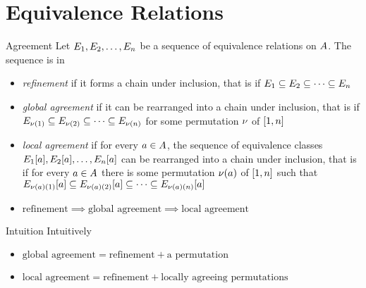 \documentclass{beamer}
\begin{document}
\section{Equivalence Relations}
\begin{frame}{Agreement}
Let $E_{1},E_{2},\dots,E_{n}$ be a sequence of equivalence relations on
$A$. The sequence is in
\begin{itemize}
  \item
  \emph{refinement} if it forms a chain under
  inclusion,
  that is if $E_{1}\subseteq E_{2}\subseteq\dots\subseteq E_{n}$
  
  \pause
  \item
  \emph{global agreement} if it can be rearranged into
  a chain under inclusion,
  that is if $E_{\nu(1)}\subseteq E_{\nu(2)}\subseteq\dots
  \subseteq E_{\nu(n)}$ for some permutation $\nu$ of $[1,n]$
  
  \pause
  \item
  \emph{local agreement} if for every $a\in A$,
  the sequence of equivalence classes
  $E_{1}[a],E_{2}[a],\dots,E_{n}[a]$ can be rearranged into a
  chain under inclusion, that is if for every $a\in A$ there
  is some permutation $\nu(a)$ of $[1,n]$ such that
  $E_{\nu(a)(1)}[a]\subseteq E_{\nu(a)(2)}[a]\subseteq
  \dots\subseteq E_{\nu(a)(n)}[a]$
  
  \pause
  \item
  $\text{refinement} \implies \text{global agreement} \implies \text{local
  agreement}$
\end{itemize}
\end{frame}

\begin{frame}{Intuition}
Intuitively
\begin{itemize}
  \item 
  $\text{global agreement} = \text{refinement} + \text{a permutation}$
  
  \pause
  \item
  $\text{local agreement} = \text{refinement} + \text{locally agreeing
  permutations}$
\end{itemize}
\end{frame}
\end{document}
